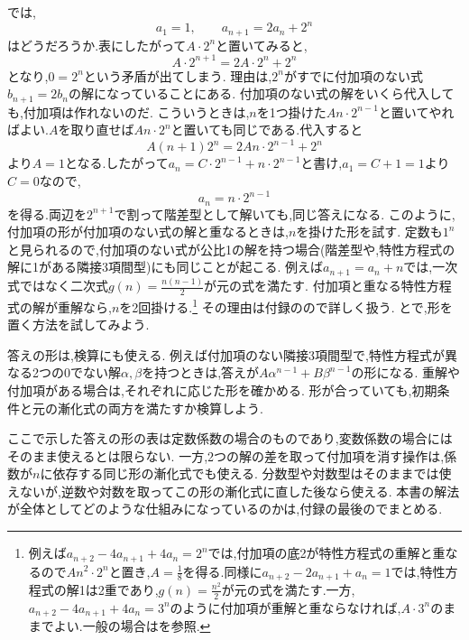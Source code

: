 では,
\[
  a_1=1,\qquad a_{n+1}=2a_n+2^n
\]
はどうだろうか.表にしたがって$A\cdot2^n$と置いてみると,
\[
  A\cdot2^{n+1}=2A\cdot2^n+2^n
\]
となり,$0=2^n$という矛盾が出てしまう.
理由は,$2^n$がすでに付加項のない式$b_{n+1}=2b_n$の解になっていることにある.
付加項のない式の解をいくら代入しても,付加項は作れないのだ.
こういうときは,$n$を1つ掛けた$An\cdot2^{n-1}$と置いてやればよい.$A$を取り直せば$An\cdot2^n$と置いても同じである.代入すると
\[
  A(n+1)2^n=2An\cdot2^{n-1}+2^n
\]
より$A=1$となる.したがって$a_n=C\cdot2^{n-1}+n\cdot2^{n-1}$と書け,$a_1=C+1=1$より$C=0$なので,
\[
  a_n=n\cdot2^{n-1}
\]
を得る.両辺を$2^{n+1}$で割って階差型として解いても,同じ答えになる.
このように,付加項の形が付加項のない式の解と重なるときは,$n$を掛けた形を試す.
定数も$1^n$と見られるので,付加項のない式が公比1の解を持つ場合(階差型や,特性方程式の解に1がある隣接3項間型)にも同じことが起こる.
例えば$a_{n+1}=a_n+n$では,一次式ではなく二次式$g(n)=\frac{n(n-1)}2$が元の式を満たす.
付加項と重なる特性方程式の解が重解なら,$n$を2回掛ける.\footnote{例えば$a_{n+2}-4a_{n+1}+4a_n=2^n$では,付加項の底2が特性方程式の重解と重なるので$An^2\cdot2^n$と置き,$A=\frac18$を得る.同様に$a_{n+2}-2a_{n+1}+a_n=1$では,特性方程式の解1は2重であり,$g(n)=\frac{n^2}{2}$が元の式を満たす.一方,$a_{n+2}-4a_{n+1}+4a_n=3^n$のように付加項が重解と重ならなければ,$A\cdot3^n$のままでよい.一般の場合はを参照.}
その理由は付録のので詳しく扱う.
とで,形を置く方法を試してみよう.

答えの形は,検算にも使える.
例えば付加項のない隣接3項間型で,特性方程式が異なる2つの0でない解$\alpha,\beta$を持つときは,答えが$A\alpha^{n-1}+B\beta^{n-1}$の形になる.
重解や付加項がある場合は,それぞれに応じた形を確かめる.
形が合っていても,初期条件と元の漸化式の両方を満たすか検算しよう.

ここで示した答えの形の表は定数係数の場合のものであり,変数係数の場合にはそのまま使えるとは限らない.
一方,2つの解の差を取って付加項を消す操作は,係数が$n$に依存する同じ形の漸化式でも使える.
分数型や対数型はそのままでは使えないが,逆数や対数を取ってこの形の漸化式に直した後なら使える.
本書の解法が全体としてどのような仕組みになっているのかは,付録の最後のでまとめる.
